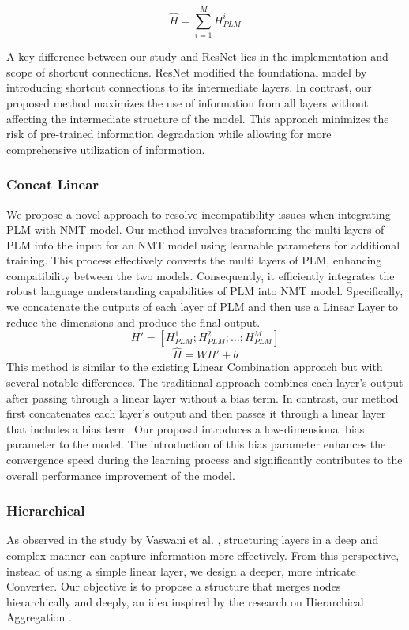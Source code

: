 \documentclass[conference]{IEEEtran}
\begin{document}
\begin{equation}
\hat{H} = \sum_{i=1}^{M} H_{PLM}^i
\end{equation}

A key difference between our study and ResNet \cite{He2015} lies in the implementation and scope of shortcut connections. ResNet \cite{He2015} modified the foundational model by introducing shortcut connections to its intermediate layers. In contrast, our proposed method maximizes the use of information from all layers without affecting the intermediate structure of the model. This approach minimizes the risk of pre-trained information degradation while allowing for more comprehensive utilization of information.

\subsubsection{Concat Linear} 
We propose a novel approach to resolve incompatibility issues when integrating PLM with NMT model. Our method involves transforming the multi layers of PLM into the input for an NMT model using learnable parameters for additional training. This process effectively converts the multi layers of PLM, enhancing compatibility between the two models. Consequently, it efficiently integrates the robust language understanding capabilities of PLM into NMT model. Specifically, we concatenate the outputs of each layer of PLM and then use a Linear Layer to reduce the dimensions and produce the final output.
\begin{equation}
H' = [H_{PLM}^1; H_{PLM}^2; \dots; H_{PLM}^M]
\end{equation}
\begin{equation}
\hat{H} = W H' + b
\end{equation}
This method is similar to the existing Linear Combination approach \cite{dou2018exploiting} but with several notable differences. The traditional approach combines each layer's output after passing through a linear layer without a bias term. In contrast, our method first concatenates each layer's output and then passes it through a linear layer that includes a bias term. Our proposal introduces a low-dimensional bias parameter to the model. The introduction of this bias parameter enhances the convergence speed during the learning process and significantly contributes to the overall performance improvement of the model.

\subsubsection{Hierarchical} 
As observed in the study by Vaswani et al. \cite{vaswani2017attention}, structuring layers in a deep and complex manner can capture information more effectively. From this perspective, instead of using a simple linear layer, we design a deeper, more intricate Converter. Our objective is to propose a structure that merges nodes hierarchically and deeply, an idea inspired by the research on Hierarchical Aggregation \cite{dou2018exploiting}.
\end{document}
